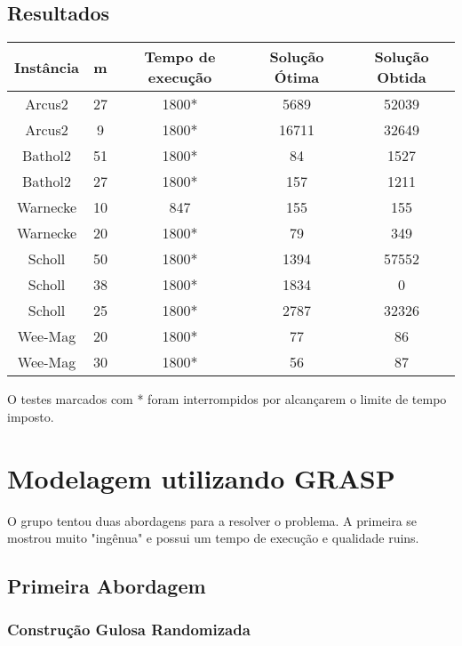\documentclass{report}
\begin{document}
{\section{Resultados}

\begin{table}[htbp]
 \begin{tabular}{|c|c|c|c|c|}
  \hline
  \textbf{Instância} & \textbf{m} & \textbf{Tempo de execução} & \textbf{Solução Ótima} & \textbf{Solução Obtida} \\
  \hline
  Arcus2 & 27 & 1800* & 5689  & 52039 \\
  \hline
  Arcus2 & 9 & 1800* & 16711 & 32649 \\
  \hline
  Bathol2 & 51 & 1800* & 84 & 1527 \\
  \hline
  Bathol2 & 27 & 1800* & 157 & 1211 \\
  \hline
  Warnecke & 10 & 847 & 155 & 155 \\
  \hline
  Warnecke & 20 & 1800* & 79 & 349 \\
  \hline
  Scholl & 50 & 1800* & 1394 & 57552 \\
  \hline
  Scholl & 38 & 1800* & 1834 & 0 \\
  \hline
  Scholl & 25 & 1800* & 2787 & 32326 \\
  \hline
  Wee-Mag & 20 & 1800* & 77 & 86 \\
  \hline
  Wee-Mag & 30 & 1800* & 56 & 87 \\
  \hline
 \end{tabular}
\end{table}

O testes marcados com * foram interrompidos por alcançarem o limite de tempo imposto.



\chapter{Modelagem utilizando GRASP}

O grupo tentou duas abordagens para a resolver o problema. A primeira se
mostrou muito "ingênua" e possui um tempo de execução e qualidade ruins.

\section{Primeira Abordagem}

\subsection{Construção Gulosa Randomizada}

}
\end{document}
